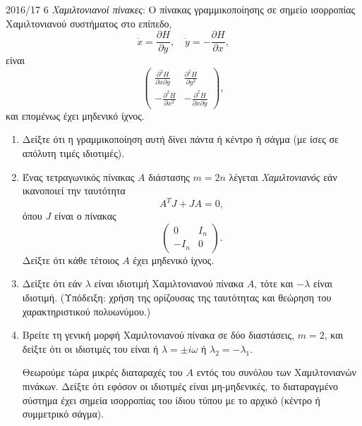 \begin{exercise}{2016/17 6}
    \emph{Χαμιλτονιανοί πίνακες}: Ο πίνακας γραμμικοποίησης σε σημείο ισορροπίας
    Χαμιλτονιανού συστήματος στο επίπεδο,
    \begin{equation*}
        \dot{x} = \frac{\partial H}{\partial y}, \quad
        \dot{y} = -\frac{\partial H}{\partial x},
    \end{equation*}
    είναι
    \begin{equation*}
        \begin{pmatrix}
            \frac{\partial ^2 H}{\partial x\partial y} &
            \frac{\partial ^2 H}{\partial y^2} \\
            -\frac{\partial ^2 H}{\partial x^2} &
            -\frac{\partial ^2 H}{\partial x\partial y}
        \end{pmatrix},
    \end{equation*}
    και επομένως έχει μηδενικό ίχνος.

    \begin{enumerate}[label= (\alph*)]
        \item Δείξτε ότι η γραμμικοποίηση αυτή δίνει πάντα ή κέντρο ή σάγμα (με
            ίσες σε απόλυτη τιμές ιδιοτιμές).
        \item Ένας τετραγωνικός πίνακας \( A \) διάστασης \( m = 2n \) λέγεται
            \emph{Χαμιλτονιανός} εάν ικανοποιεί την ταυτότητα
            \[
                A^{T}J + JA = 0,
            \]
            όπου \( J \) είναι ο πίνακας
            \begin{equation*}
                \begin{pmatrix}
                    0 &
                    I_n \\
                    -I_n &
                    0
                \end{pmatrix}.
            \end{equation*}
            Δείξτε ότι κάθε τέτοιος \( A \) έχει μηδενικό ίχνος.
        \item Δείξτε ότι εάν \( \lambda \) είναι ιδιοτιμή Χαμιλτονιανού πίνακα
            \( A \), τότε και \( -\lambda \) είναι ιδιοτιμή. (Υπόδειξη: χρήση
                της ορίζουσας της ταυτότητας και θεώρηση του χαρακτηριστικού
            πολυωνύμου.)
        \item Βρείτε τη γενική μορφή Χαμιλτονιανού πίνακα σε δύο διαστάσεις,
            \( m = 2 \), και δείξτε ότι οι ιδιοτιμές του είναι ή \( \lambda =
            \pm i\omega \) ή \( \lambda_2 = -\lambda_1 \).

            Θεωρούμε τώρα μικρές διαταραχές του \( A \) εντός του συνόλου των
            Χαμιλτονιανών πινάκων. Δείξτε ότι εφόσον οι ιδιοτιμές είναι
            μη-μηδενικές, το διαταραγμένο σύστημα έχει σημεία ισορροπίας του
            ίδιου τύπου με το αρχικό (κέντρο ή συμμετρικό σάγμα).
    \end{enumerate}
\end{exercise}
